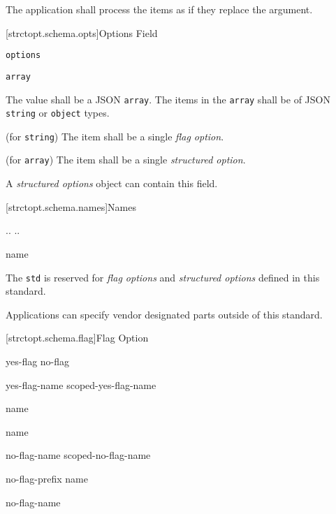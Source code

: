 The application shall process the items as if they replace the
 argument.

[strctopt.schema.opts]{Options Field}

\begin{itemdescr}

	\pnum \fldname \verb|options|

	\pnum \fldtype \verb|array|

	\pnum \fldval
	The value shall be a JSON \verb|array|. The items in the \verb|array| shall
	be of JSON \verb|string| or \verb|object| types.

	\pnum \flditems
	(for \verb|string|) The item shall be a single \emph{flag option}.

	\pnum \flditems
	(for \verb|array|) The item shall be a single \emph{structured option}.

	\pnum \flddesc
	A \emph{structured options} object can contain this field.

\end{itemdescr}

[strctopt.schema.names]{Names}

\pnum
\begin{ncbnf}

\br
	\br
	 ..  \br
	 ..  \br
	   

\br
	name 

\br
	 

\end{ncbnf}

\pnum
The  \verb|std| is reserved for \emph{flag options} and
\emph{structured options} defined in this standard.

\pnum
Applications can specify vendor designated  parts outside of
this standard.

[strctopt.schema.flag]{Flag Option}

\pnum
\begin{ncbnf}

\br
	 yes-flag no-flag

\br
	 yes-flag-name scoped-yes-flag-name

\br
	name

\br
	 name

\br
	 no-flag-name scoped-no-flag-name

\br
	no-flag-prefix name

\br
	 no-flag-name

\br
	 
	 
	 

\end{ncbnf}

